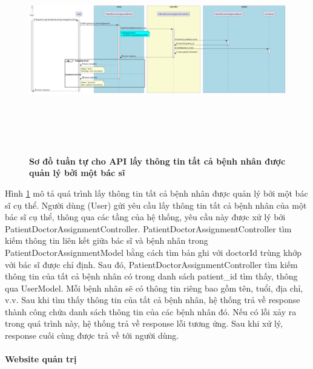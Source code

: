 \begin{figure}[H]
  \centering
  \includegraphics[width=16cm,height=9cm]{Images/server/sequence/server/getPatientsByDoctor.png}
  \caption[Sơ đồ tuần tự cho API lấy thông tin tất cả bệnh nhân được quản lý bởi một bác sĩ]{\bfseries \fontsize{12pt}{0pt}
  \selectfont Sơ đồ tuần tự cho API lấy thông tin tất cả bệnh nhân được quản lý bởi một bác sĩ }
  \label{getPatientsByDoctor} %
\end{figure}
Hình \ref{getPatientsByDoctor}  mô tả quá trình lấy thông tin tất cả bệnh nhân được quản lý bởi một bác sĩ cụ thể. Người dùng (User) gửi yêu cầu lấy thông tin tất cả bệnh nhân của một bác sĩ cụ thể, thông qua các tầng của hệ thống, yêu cầu này được xử lý bởi PatientDoctorAssignmentController. PatientDoctorAssignmentController tìm kiếm thông tin liên kết giữa bác sĩ và bệnh nhân trong PatientDoctorAssignmentModel bằng cách tìm bản ghi với doctorId trùng khớp với bác sĩ được chỉ định. Sau đó, PatientDoctorAssignmentController tìm kiếm thông tin của tất cả bệnh nhân có trong danh sách patient\_id tìm thấy, thông qua UserModel. Mỗi bệnh nhân sẽ có thông tin riêng bao gồm tên, tuổi, địa chỉ, v.v. Sau khi tìm thấy thông tin của tất cả bệnh nhân, hệ thống trả về response thành công chứa danh sách thông tin của các bệnh nhân đó. Nếu có lỗi xảy ra trong quá trình này, hệ thống trả về response lỗi tương ứng. Sau khi xử lý, response cuối cùng được trả về tới người dùng.


\paragraph{Website quản trị}
\mbox{}


